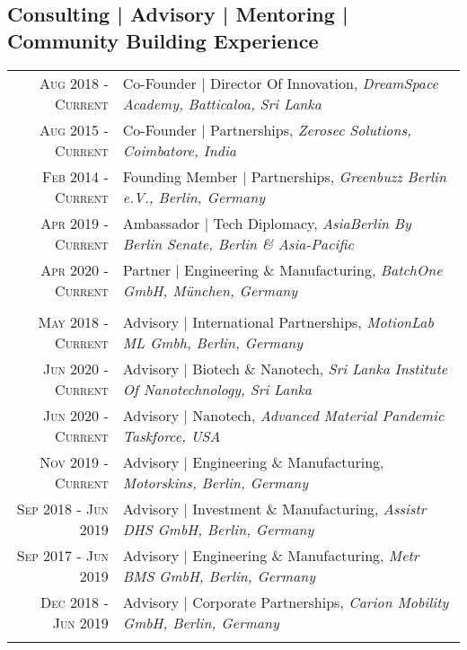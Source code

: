 \subsection{Consulting | Advisory | Mentoring | Community Building Experience}
\begin{longtable}
	{r|p{13cm}}
	\textsc{Aug 2018 - Current} & Co-Founder | Director Of Innovation, \emph{DreamSpace Academy, Batticaloa, Sri Lanka}\\
	\textsc{Aug 2015 - Current} & Co-Founder | Partnerships, \emph{Zerosec Solutions, Coimbatore, India}\\
	\textsc{Feb 2014 - Current} & Founding Member | Partnerships, \emph{Greenbuzz Berlin e.V., Berlin, Germany}\\
	\textsc{Apr 2019 - Current} & Ambassador | Tech Diplomacy, \emph{AsiaBerlin By Berlin Senate, Berlin \& Asia-Pacific}\\
	\textsc{Apr 2020 - Current} & Partner | Engineering \& Manufacturing, \emph{BatchOne GmbH, München, Germany}\\

	\multicolumn{2}{c}{} \\

	\textsc{May 2018 - Current} & Advisory | International Partnerships, \emph{MotionLab ML Gmbh, Berlin, Germany}\\
	\textsc{Jun 2020 - Current} & Advisory | Biotech \& Nanotech, \emph{Sri Lanka Institute Of Nanotechnology, Sri Lanka}\\
	\textsc{Jun 2020 - Current} & Advisory | Nanotech, \emph{Advanced Material Pandemic Taskforce, USA}\\
	\textsc{Nov 2019 - Current} & Advisory | Engineering \& Manufacturing, \emph{Motorskins, Berlin, Germany}\\
	\textsc{Sep 2018 - Jun 2019} & Advisory | Investment \& Manufacturing, \emph{Assistr DHS GmbH, Berlin, Germany}\\
	\textsc{Sep 2017 - Jun 2019} & Advisory | Engineering \& Manufacturing, \emph{Metr BMS GmbH, Berlin, Germany}\\
	\textsc{Dec 2018 - Jun 2019} & Advisory | Corporate Partnerships, \emph{Carion Mobility GmbH, Berlin, Germany}\\

	\multicolumn{2}{c}{} \\


\end{longtable}
